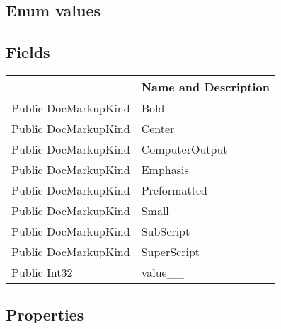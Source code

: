\documentclass[11pt, oneside, a4paper]{book}
\begin{document}
\subsection{Enum values}

\subsection{Fields}
\begin{center}
\begin{tabular}{| p{3cm} | p{12cm} | }
\hline
\textbf{ } & \textbf{ Name and Description}\\
\hline
 Public  DocMarkupKind &  Bold\hypertarget{SoftwareEngineeringTools.{}Documentation.{}DocMarkupKind.{}Bold}{}\\
\hline
 Public  DocMarkupKind &  Center\hypertarget{SoftwareEngineeringTools.{}Documentation.{}DocMarkupKind.{}Center}{}\\
\hline
 Public  DocMarkupKind &  ComputerOutput\hypertarget{SoftwareEngineeringTools.{}Documentation.{}DocMarkupKind.{}ComputerOutput}{}\\
\hline
 Public  DocMarkupKind &  Emphasis\hypertarget{SoftwareEngineeringTools.{}Documentation.{}DocMarkupKind.{}Emphasis}{}\\
\hline
 Public  DocMarkupKind &  Preformatted\hypertarget{SoftwareEngineeringTools.{}Documentation.{}DocMarkupKind.{}Preformatted}{}\\
\hline
 Public  DocMarkupKind &  Small\hypertarget{SoftwareEngineeringTools.{}Documentation.{}DocMarkupKind.{}Small}{}\\
\hline
 Public  DocMarkupKind &  SubScript\hypertarget{SoftwareEngineeringTools.{}Documentation.{}DocMarkupKind.{}SubScript}{}\\
\hline
 Public  DocMarkupKind &  SuperScript\hypertarget{SoftwareEngineeringTools.{}Documentation.{}DocMarkupKind.{}SuperScript}{}\\
\hline
 Public  Int32 &  value\_\_\hypertarget{SoftwareEngineeringTools.{}Documentation.{}DocMarkupKind.{}value\_\_}{}\\
\hline
\end{tabular}
\end{center}

\subsection{Properties}
\end{document}
